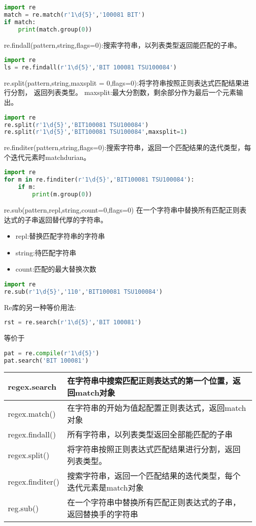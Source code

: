 \documentclass{book}
\begin{document}
\begin{lstlisting}[language=Python]
import re
match = re.match(r'1\d{5}','100081 BIT')
if match:
    print(match.group(0))
\end{lstlisting}
re.findall(pattern,string,flags=0):搜索字符串，以列表类型返回能匹配的子串。
\begin{lstlisting}[language=Python]
import re
ls = re.findall(r'1\d{5}','BIT 100081 TSU100084')
\end{lstlisting}
re.split(pattern,string,maxsplit = 0,flags=0):将字符串按照正则表达式匹配结果进行分割，
返回列表类型。\newline
maxsplit:最大分割数，剩余部分作为最后一个元素输出。\newline
\begin{lstlisting}[language=Python]
import re
re.split(r'1\d{5}','BIT100081 TSU100084')
re.split(r'1\d{5}','BIT100081 TSU100084',maxsplit=1)
\end{lstlisting}
re.finditer(pattern,string,flags=0):搜索字符串，返回一个匹配结果的迭代类型，每个迭代元素时matchdurian。
\begin{lstlisting}[language=Python]
import re
for m in re.finditer(r'1\d{5}','BIT100081 TSU100084'):
    if m:
        print(m.group(0))
\end{lstlisting}
re.sub(pattern,repl,string,count=0,flags=0)
在一个字符串中替换所有匹配正则表达式的子串返回替代厚的字符串。
\begin{itemize}
\item repl:替换匹配字符串的字符串
\item string:待匹配字符串
\item count:匹配的最大替换次数
\end{itemize}
\begin{lstlisting}[language=Python]
import re
re.sub(r'1\d{5}','110','BIT100081 TSU100084')
\end{lstlisting}
Re库的另一种等价用法:
\begin{lstlisting}[language=Python]
rst = re.search(r'1\d{5}','BIT 100081')
\end{lstlisting}
等价于
\begin{lstlisting}[language=Python]
pat = re.compile(r'1\d{5}')
pat.search('BIT 100081')
\end{lstlisting}
\begin{center}
	\begin{tabular}{|p{2cm}|p{8cm}|}
\hline
regex.search&在字符串中搜索匹配正则表达式的第一个位置，返回match对象\\
\hline
regex.match()&在字符串的开始为值起配置正则表达式，返回match对象\\
\hline
regex.findall()&所有字符串，以列表类型返回全部能匹配的子串\\
\hline
regex.split()&将字符串按照正则表达式匹配结果进行分割，返回列表类型。\\
\hline
regex.finditer()&搜索字符串，返回一个匹配结果的迭代类型，每个迭代元素是match对象\\
\hline
reg.sub()&在一个字符串中替换所有匹配正则表达式的子串，返回替换手的字符串\\
\hline
\end{tabular}
\end{center}
\end{document}
